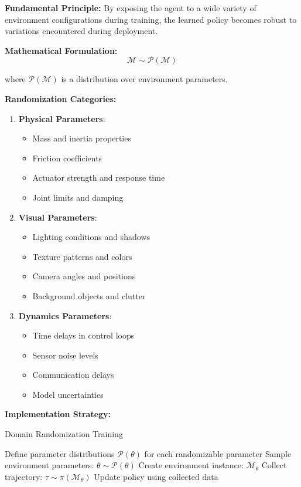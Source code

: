 \documentclass[12pt]{article}
\begin{document}
{{{{\textbf{Fundamental Principle:}
By exposing the agent to a wide variety of environment configurations during training, the learned policy becomes robust to variations encountered during deployment.

\textbf{Mathematical Formulation:}
\begin{equation}
\mathcal{M} \sim \mathcal{P}(\mathcal{M})
\end{equation}

where $\mathcal{P}(\mathcal{M})$ is a distribution over environment parameters.

\textbf{Randomization Categories:}
\begin{enumerate}
\item \textbf{Physical Parameters}:
\begin{itemize}
\item Mass and inertia properties
\item Friction coefficients
\item Actuator strength and response time
\item Joint limits and damping
\end{itemize}

\item \textbf{Visual Parameters}:
\begin{itemize}
\item Lighting conditions and shadows
\item Texture patterns and colors
\item Camera angles and positions
\item Background objects and clutter
\end{itemize}

\item \textbf{Dynamics Parameters}:
\begin{itemize}
\item Time delays in control loops
\item Sensor noise levels
\item Communication delays
\item Model uncertainties
\end{itemize}
\end{enumerate}

\textbf{Implementation Strategy:}
\begin{algorithm}[H]
\caption{Domain Randomization Training}
\begin{algorithmic}[1]
\STATE Define parameter distributions $\mathcal{P}(\theta)$ for each randomizable parameter
    \STATE Sample environment parameters: $\theta \sim \mathcal{P}(\theta)$
    \STATE Create environment instance: $\mathcal{M}_\theta$
    \STATE Collect trajectory: $\tau \sim \pi(\mathcal{M}_\theta)$
    \STATE Update policy using collected data
\ENDFOR
\end{algorithmic}
\end{algorithm}

}}}}
\end{document}
